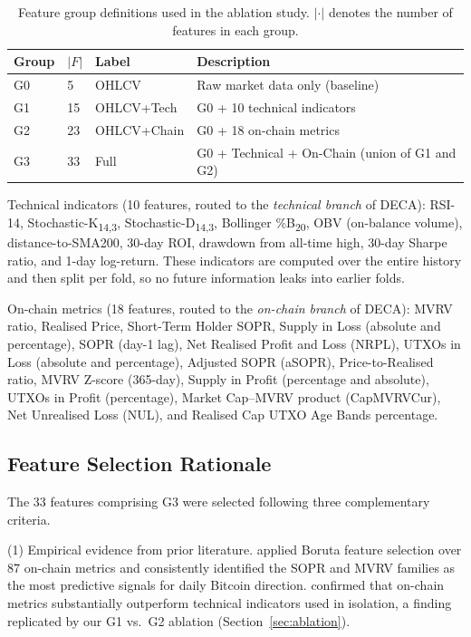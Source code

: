 \documentclass[final,3p,times,authoryear]{elsarticle}
\begin{document}
\begin{table}[ht]
\centering
\caption{Feature group definitions used in the ablation study.
  $|\cdot|$ denotes the number of features in each group.}
\label{tab:feature_groups}
\small
\begin{tabular}{lll p{6cm}}
\hline
Group & $|F|$ & Label & Description \\
\hline
G0 & 5  & OHLCV       & Raw market data only (baseline) \\
G1 & 15 & OHLCV+Tech  & G0 + 10 technical indicators \\
G2 & 23 & OHLCV+Chain & G0 + 18 on-chain metrics \\
G3 & 33 & Full        & G0 + Technical + On-Chain (union of G1 and G2) \\
\hline
\end{tabular}
\end{table}

\noindent Technical indicators (10 features, routed to the
\emph{technical branch} of DECA):
RSI-14, Stochastic-K\textsubscript{14,3}, Stochastic-D\textsubscript{14,3},
Bollinger \%B\textsubscript{20}, OBV (on-balance volume),
distance-to-SMA200, 30-day ROI, drawdown from all-time high,
30-day Sharpe ratio, and 1-day log-return.
These indicators are computed over the entire history and then split per
fold, so no future information leaks into earlier folds.

\noindent On-chain metrics (18 features, routed to the
\emph{on-chain branch} of DECA):
MVRV ratio, Realised Price, Short-Term Holder SOPR,
Supply in Loss (absolute and percentage), SOPR (day-1 lag),
Net Realised Profit and Loss (NRPL), UTXOs in Loss (absolute and
percentage), Adjusted SOPR (aSOPR), Price-to-Realised ratio,
MVRV Z-score (365-day), Supply in Profit (percentage and absolute),
UTXOs in Profit (percentage), Market Cap--MVRV product (CapMVRVCur),
Net Unrealised Loss (NUL), and Realised Cap UTXO Age Bands percentage.

\subsection{Feature Selection Rationale}
\label{sec:feature_rationale}

The 33 features comprising G3 were selected following three complementary
criteria.

\noindent (1) Empirical evidence from prior literature.
\citet{omole2024financial} applied Boruta feature selection over 87
on-chain metrics and consistently identified the SOPR and MVRV families
as the most predictive signals for daily Bitcoin direction.
\citet{omole2025eaai} confirmed that on-chain metrics substantially
outperform technical indicators used in isolation, a finding
replicated by our G1 vs.\ G2 ablation (Section~\ref{sec:ablation}).
\end{document}

